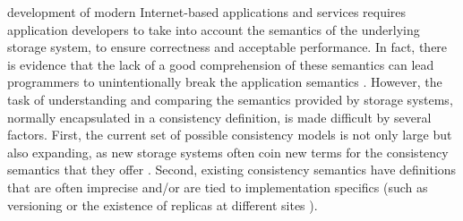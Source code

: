 \documentclass[journal,compsoc]{IEEEtran}
\begin{document}

    development of modern Internet-based applications and services requires application developers to take into account the semantics of the 
underlying storage system, to ensure correctness and acceptable performance.
In fact, there is evidence that the lack of a good comprehension of these
semantics can lead programmers to unintentionally break the application semantics \cite{Bailis:2015:FCC:2723372.2737784}. 
However, the task of understanding and comparing the semantics provided by storage systems, normally encapsulated in a consistency definition, is made difficult by several factors. First, the current set of possible consistency models is not only large but also expanding, as new storage systems often coin new terms for the consistency semantics that they offer \cite{Cooper:2008:PYH:1454159.1454167, Lloyd:2011:DSE:2043556.2043593, Lakshman:2010:CDS:1773912.1773922}.
Second, existing consistency semantics have definitions that are often imprecise and/or are tied to implementation specifics (such as versioning \cite{DBLP:conf/icde/AdyaLO00} or the existence of replicas at different sites \cite{Li:2012:MGS:2387880.2387906}).
\end{document}
